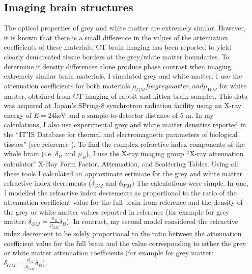\documentclass[10pt, a4paper, singlespacing]{report}
\begin{document}
\subsection{Imaging brain structures}\label{Brainz}
The optical properties of grey and white matter are extremely similar. However, it is known that there is a small difference in the values of the attenuation coefficients of these materials. CT brain imaging has been reported to yield clearly demarcated tissue borders at the grey/white matter boundaries\cite{Beltran2}. To determine if density differences alone produce phase contrast when imaging extremely similar brain materials, I simulated grey and white matter. I use the attenuation coefficients for both materials $\mu_{GM} for grey matter, and \mu_{WM}$ for white matter, obtained from CT imaging of rabbit and kitten brain samples. This data was acquired at Japan's SPring-8 synchrotron radiation facility using an X-ray energy of $E = 24$keV and a sample-to-detector distance of $5$ m\cite{Linda}. In my calculations, I also use experimental grey and white matter densities reported in the ``IT’IS Database for thermal and electromagnetic parameters of biological tissues" (see reference \cite{ITIS}). To find the complex refractive index components of the whole brain (i.e. $\delta_B$ and $\mu_B$), I use the X-ray imaging group ``X-ray attenuation calculator" X-Ray Form Factor, Attenuation, and Scattering Tables\cite{NIST}.
Using all these tools I calculated an approximate estimate for the grey and white matter refractive index decrements ($\delta_{GM}$ and $\delta_{WM}$) The calculations were simple. In one, I modelled the refractive index decrements as proportional to the ratio of the attenuation coefficient value for the full brain from reference\cite{NIST} and the density of the grey or white matter values reported in reference \cite{ITIS} (for example for grey matter: $\delta_{GM} = \frac{\mu_B}{\rho_{GM}} \delta_B$). In contrast, my second model considered the refractive index decrement to be solely proportional to the ratio between the attenuation coefficient value for the full brain and the value corresponding to either the grey or white matter attenuation coefficients (for example for grey matter: $\delta_{GM} = \frac{\mu_B}{\mu_{GM}} \delta_B$). 

\end{document}
